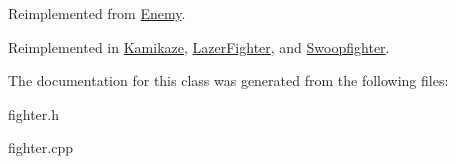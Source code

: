 Reimplemented from \hyperlink{classEnemy_ae672ccf745ec7fc74f9eb5d2001828d2}{Enemy}.



Reimplemented in \hyperlink{classKamikaze_ae194f7e2fd550953fdaff15d91962d49}{Kamikaze}, \hyperlink{classLazerFighter_a8249d95ea87e414c34c56ada5d1f8689}{LazerFighter}, and \hyperlink{classSwoopfighter_aba26309d58b59785f9dcbdc7f22d49bd}{Swoopfighter}.



The documentation for this class was generated from the following files:\begin{DoxyCompactItemize}
\item 
fighter.h\item 
fighter.cpp\end{DoxyCompactItemize}
